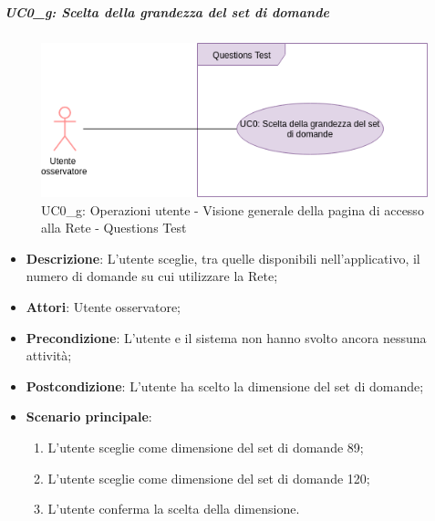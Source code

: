 \subparagraph{UC0\_g: Scelta della grandezza del set di domande}\mbox{}
\label{UC0_g: Scelta della grandezza del set di domande}
\noindent
\begin{figure}[H]
\centering
	\includegraphics[width=0.80\linewidth]{./image/uc0_g.png}
	\caption{UC0\_g: Operazioni utente - Visione generale della pagina di accesso alla Rete - Questions Test}
	\label{UC0_g: Operazioni utente - Visione generale della pagina di accesso alla Rete - Questions Test}
\end{figure}
\noindent
\begin{itemize}
\item \textbf{Descrizione}: L'utente sceglie, tra quelle disponibili nell'applicativo, il numero di domande su cui utilizzare la Rete;
\item \textbf{Attori}: Utente osservatore;
\item \textbf{Precondizione}: L'utente e il sistema non hanno svolto ancora nessuna attivit\`a;
\item \textbf{Postcondizione}: L'utente ha scelto la dimensione del set di domande;
\item \textbf{Scenario principale}:
\begin{enumerate}
\item L'utente sceglie come dimensione del set di domande 89;
\item L'utente sceglie come dimensione del set di domande 120;
\item L'utente conferma la scelta della dimensione.
\end{enumerate}
\end{itemize}



